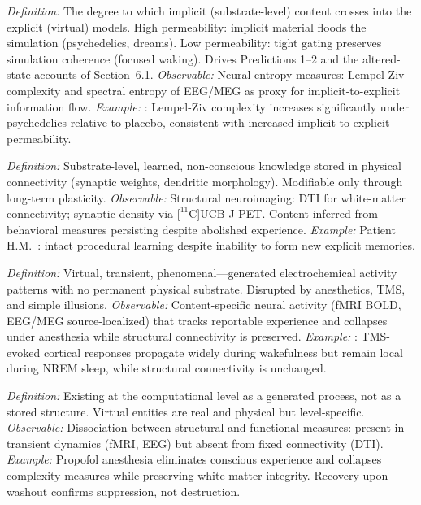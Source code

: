 \documentclass[12pt]{article}
\begin{document}
\begin{description}[leftmargin=0pt,labelindent=0pt,itemsep=0.8em]
\item[\textsc{Permeability}] \emph{Definition:} The degree to which implicit (substrate-level) content crosses into the explicit (virtual) models. High permeability: implicit material floods the simulation (psychedelics, dreams). Low permeability: tight gating preserves simulation coherence (focused waking). Drives Predictions 1--2 and the altered-state accounts of Section~6.1. \emph{Observable:} Neural entropy measures: Lempel-Ziv complexity and spectral entropy of EEG/MEG as proxy for implicit-to-explicit information flow. \emph{Example:} \citet{Schartner2017}: Lempel-Ziv complexity increases significantly under psychedelics relative to placebo, consistent with increased implicit-to-explicit permeability.

\item[\textsc{Implicit model} (IWM/ISM)] \emph{Definition:} Substrate-level, learned, non-conscious knowledge stored in physical connectivity (synaptic weights, dendritic morphology). Modifiable only through long-term plasticity. \emph{Observable:} Structural neuroimaging: DTI for white-matter connectivity; synaptic density via $[^{11}$C]UCB-J PET. Content inferred from behavioral measures persisting despite abolished experience. \emph{Example:} Patient H.M.\ \citep{ScovilleMilner1957,Milner1962}: intact procedural learning despite inability to form new explicit memories.

\item[\textsc{Explicit model} (EWM/ESM)] \emph{Definition:} Virtual, transient, phenomenal---generated electrochemical activity patterns with no permanent physical substrate. Disrupted by anesthetics, TMS, and simple illusions. \emph{Observable:} Content-specific neural activity (fMRI BOLD, EEG/MEG source-localized) that tracks reportable experience and collapses under anesthesia while structural connectivity is preserved. \emph{Example:} \citet{Massimini2005}: TMS-evoked cortical responses propagate widely during wakefulness but remain local during NREM sleep, while structural connectivity is unchanged.

\item[\textsc{Virtual} (as in FMT)] \emph{Definition:} Existing at the computational level as a generated process, not as a stored structure. Virtual entities are real and physical but level-specific. \emph{Observable:} Dissociation between structural and functional measures: present in transient dynamics (fMRI, EEG) but absent from fixed connectivity (DTI). \emph{Example:} Propofol anesthesia eliminates conscious experience and collapses complexity measures \citep{Casali2013} while preserving white-matter integrity. Recovery upon washout confirms suppression, not destruction.


\end{description}
\end{document}
